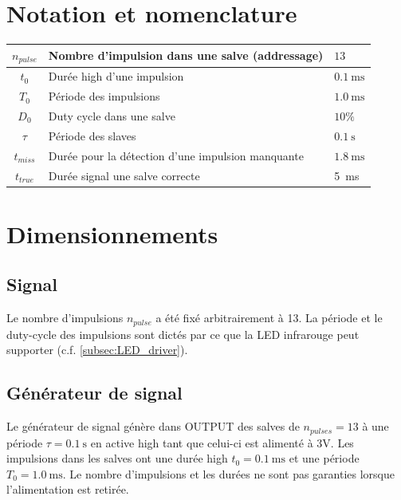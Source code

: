 \documentclass[french]{layout/Report}
\begin{document}
\section{Notation et nomenclature}

\begin{center}
	\begin{tabular}{| c | l | l |}
		\hline
		$n_{pulse}$	& Nombre d'impulsion dans une salve (addressage) & $13$ \\ \hline
		$t_0$				& Durée high d'une impulsion & $\SI{0.1}{\milli\second}$	\\ \hline
		$T_0$				& Période des impulsions& $\SI{1.0}{\milli\second}$	\\ \hline
		$D_0$				& Duty cycle dans une salve & $10\%$	\\ \hline
		$\tau$			& Période des slaves	& $\SI{0.1}{\second}$\\ \hline
		$t_{miss}$  & Durée pour la détection d'une impulsion manquante & $\SI{1.8}{\milli\second}$ \\ \hline
		$t_{true}$  & Durée signal une salve correcte & \SI{5}{\milli\second}\\ \hline
	\end{tabular}
\end{center}

\section{Dimensionnements}
\subsection{Signal}
Le nombre d'impulsions $n_{pulse}$ a été fixé arbitrairement à 13. La période et le duty-cycle des impulsions sont dictés par ce que la LED infrarouge peut supporter (c.f. \ref{subsec:LED_driver}).

\subsection{Générateur de signal}
Le générateur de signal génère dans OUTPUT des salves de $n_{pulses} = 13$ à une période $\tau = \SI{0.1}{\second}$ en active high tant que celui-ci est alimenté à 3V. Les impulsions dans les salves ont une durée high $t_0 = \SI{0.1}{\milli\second}$ et une période $T_0 = \SI{1.0}{\milli\second}$. Le nombre d'impulsions et les durées ne sont pas garanties lorsque l'alimentation est retirée.
\end{document}
